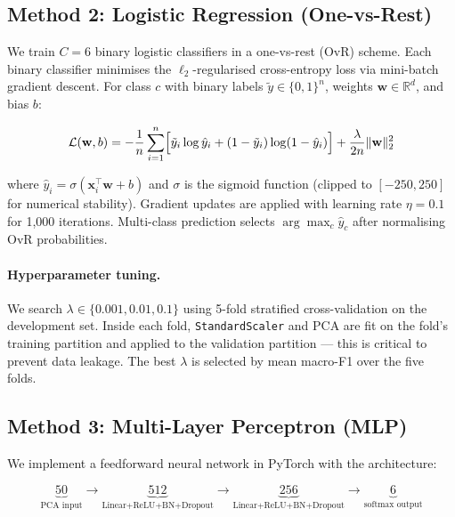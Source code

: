 \documentclass[11pt,letterpaper]{article}
\begin{document}
\subsection{Method 2: Logistic Regression (One-vs-Rest)}
\label{sec:method2}

We train $C = 6$ binary logistic classifiers in a one-vs-rest (OvR) scheme.
Each binary classifier minimises the $\ell_2$-regularised cross-entropy loss
via mini-batch gradient descent.  For class $c$ with binary labels
$\tilde{y} \in \{0,1\}^n$, weights $\mathbf{w} \in \mathbb{R}^d$, and
bias $b$:

\begin{equation}
  \mathcal{L}(\mathbf{w}, b) =
    -\frac{1}{n}\sum_{i=1}^n \Bigl[\tilde{y}_i \log \hat{y}_i +
      (1-\tilde{y}_i)\log(1-\hat{y}_i)\Bigr]
    + \frac{\lambda}{2n} \|\mathbf{w}\|_2^2
\end{equation}

where $\hat{y}_i = \sigma(\mathbf{x}_i^\top \mathbf{w} + b)$ and $\sigma$ is
the sigmoid function (clipped to $[-250, 250]$ for numerical stability).
Gradient updates are applied with learning rate $\eta = 0.1$ for 1,000
iterations.  Multi-class prediction selects $\arg\max_c \hat{y}_c$ after
normalising OvR probabilities.

\paragraph{Hyperparameter tuning.}
We search $\lambda \in \{0.001, 0.01, 0.1\}$ using 5-fold stratified
cross-validation on the development set.  Inside each fold, \texttt{StandardScaler}
and PCA are fit on the fold's training partition and applied to the validation
partition --- this is critical to prevent data leakage.  The best $\lambda$ is
selected by mean macro-F1 over the five folds.

\subsection{Method 3: Multi-Layer Perceptron (MLP)}
\label{sec:method3}

We implement a feedforward neural network in PyTorch with the architecture:

\begin{equation*}
  \underbrace{50}_{\text{PCA input}} \to
  \underbrace{512}_{\text{Linear+ReLU+BN+Dropout}} \to
  \underbrace{256}_{\text{Linear+ReLU+BN+Dropout}} \to
  \underbrace{6}_{\text{softmax output}}
\end{equation*}
\end{document}
